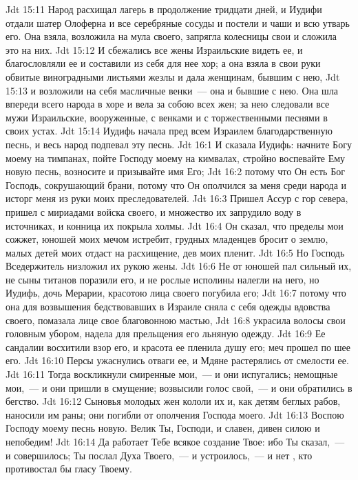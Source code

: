 \rsbpar\vs Jdt 15:11 Народ расхищал лагерь в продолжение тридцати дней, и Иудифи отдали шатер Олоферна и все серебряные сосуды и постели и чаши и всю утварь его. Она взяла, возложила на мула своего, запрягла колесницы свои и сложила это на них.
\vs Jdt 15:12 И сбежались все жены Израильские видеть ее, и благословляли ее и составили из себя для нее хор; а она взяла в свои руки обвитые виноградными листьями жезлы и дала женщинам, бывшим с нею,
\vs Jdt 15:13 и возложили на себя масличные венки~--- она и бывшие с нею. Она шла впереди всего народа в хоре и вела за собою всех жен; за нею следовали все мужи Израильские, вооруженные, с венками и с торжественными песнями в своих устах.
\vs Jdt 15:14 Иудифь начала пред всем Израилем благодарственную песнь, и весь народ подпевал эту песнь.
\vs Jdt 16:1 И сказала Иудифь: начните Богу моему на тимпанах, пойте Господу моему на кимвалах, стройно воспевайте Ему новую песнь, возносите и призывайте имя Его;
\vs Jdt 16:2 потому что Он есть Бог Господь, сокрушающий брани, потому что Он ополчился за меня среди народа и исторг меня из руки моих преследователей.
\vs Jdt 16:3 Пришел Ассур с гор севера, пришел с мириадами войска своего, и множество их запрудило воду в источниках, и конница их покрыла холмы.
\vs Jdt 16:4 Он сказал, что пределы мои сожжет, юношей моих мечом истребит, грудных младенцев бросит о землю, малых детей моих отдаст на расхищение, дев моих пленит.
\vs Jdt 16:5 Но Господь Вседержитель низложил их рукою жены.
\vs Jdt 16:6 Не от юношей пал сильный их, не сыны титанов поразили его, и не рослые исполины налегли на него, но Иудифь, дочь Мерарии, красотою лица своего погубила его;
\vs Jdt 16:7 потому что она для возвышения бедствовавших в Израиле сняла с себя одежды вдовства своего, помазала лице свое благовонною мастью,
\vs Jdt 16:8 украсила волосы свои головным убором, надела для прельщения его льняную одежду.
\vs Jdt 16:9 Ее сандалии восхитили взор его, и красота ее пленила душу его; меч прошел по шее его.
\vs Jdt 16:10 Персы ужаснулись отваги ее, и Мдяне растерялись от смелости ее.
\vs Jdt 16:11 Тогда воскликнули смиренные мои,~--- и они испугались; немощные мои,~--- и они пришли в смущение; возвысили голос свой,~--- и они обратились в бегство.
\vs Jdt 16:12 Сыновья молодых жен кололи их и, как детям беглых рабов, наносили им раны; они погибли от ополчения Господа моего.
\vs Jdt 16:13 Воспою Господу моему песнь новую. Велик Ты, Господи, и славен, дивен силою и непобедим!
\vs Jdt 16:14 Да работает Тебе всякое создание Твое: ибо Ты сказал,~--- и совершилось; Ты послал Духа Твоего,~--- и устроилось,~--- и нет , кто противостал бы гласу Твоему.
